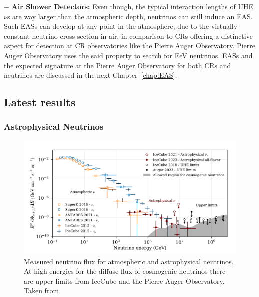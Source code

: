 \begin{description}
  \item $-$ \textbf{Air Shower Detectors:} Even though, the typical interaction lengths of UHE$\nu$s are way larger than the atmospheric depth, neutrinos can still induce an EAS. Such EASs can develop at any point in the atmosphere, due to the virtually constant neutrino cross-section in air, in comparison to \glspl{CR} offering a distinctive aspect for detection at \gls{CR} observatories like the Pierre Auger Observatory. Pierre Auger Observatory uses the said property to search for EeV neutrinos. EASs and the expected signature at the Pierre Auger Observatory for both \glspl{CR} and neutrinos are discussed in the next Chapter~\ref{chap:EAS}.   

  \end{description}

\subsection{Latest results}
  \label{subsec:Nuresults}
  
\subsubsection*{Astrophysical Neutrinos}

\begin{figure}[t!]
  \centering
  \includegraphics[width=14.5cm]{thesis_figures/CRnNu/Nu_flux_measurement.png}
  \caption{Measured neutrino flux for atmospheric and astrophysical neutrinos. At high energies for the diffuse flux of cosmogenic neutrinos there are upper limits from IceCube and the Pierre Auger Observatory. Taken from~\cite{ParticleDataGroup:2024cfk}}
  \label{fig:Nu_flux_measurement}
\end{figure}

